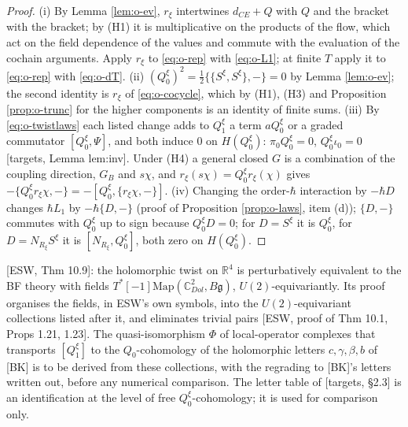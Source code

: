 \begin{proof}
(i) By Lemma \ref{lem:o-ev}, $r_\xi$ intertwines $d_{CE}+Q$ with $Q$ and the bracket with the bracket; by (H1) it is multiplicative on the products of the flow, which act on the field dependence of the values and commute with the evaluation of the cochain arguments. Apply $r_\xi$ to \eqref{eq:o-rep} with \eqref{eq:o-L1}; at finite $T$ apply it to \eqref{eq:o-rep} with \eqref{eq:o-dT}. (ii) $(Q_0^\xi)^2=\tfrac12\{\{S^\xi,S^\xi\},-\}=0$ by Lemma \ref{lem:o-ev}; the second identity is $r_\xi$ of \eqref{eq:o-cocycle}, which by (H1), (H3) and Proposition \ref{prop:o-trunc} for the higher components is an identity of finite sums. (iii) By \eqref{eq:o-twistlaws} each listed change adds to $Q_1^\xi$ a term $aQ_0^\xi$ or a graded commutator $[Q_0^\xi,\Psi]$, and both induce $0$ on $H(Q_0^\xi)$: $\pi_0Q_0^\xi=0$, $Q_0^\xi\iota_0=0$ [targets, Lemma lem:inv]. Under (H4) a general closed $G$ is a combination of the coupling direction, $G_B$ and $s\chi$, and $r_\xi(s\chi)=Q_0^\xi r_\xi(\chi)$ gives $-\{Q_0^\xi r_\xi\chi,-\}=-[Q_0^\xi,\{r_\xi\chi,-\}]$. (iv) Changing the order-$\hbar$ interaction by $-\hbar D$ changes $\hbar L_1$ by $-\hbar\{D,-\}$ (proof of Proposition \ref{prop:o-laws}, item (d)); $\{D,-\}$ commutes with $Q_0^\xi$ up to sign because $Q_0^\xi D=0$; for $D=S^\xi$ it is $Q_0^\xi$, for $D=N_{R_\xi}S^\xi$ it is $[N_{R_\xi},Q_0^\xi]$, both zero on $H(Q_0^\xi)$.
\end{proof}

\begin{remark}
\label{rem:o-transport}
[ESW, Thm 10.9]: the holomorphic twist on $\mathbb R^4$ is perturbatively equivalent to the BF theory with fields $T^*[-1]\mathrm{Map}(\mathbb C^2_{Dol},B\mathfrak g)$, $U(2)$-equivariantly. Its proof organises the fields, in ESW's own symbols, into the $U(2)$-equivariant collections listed after it, and eliminates trivial pairs [ESW, proof of Thm 10.1, Props 1.21, 1.23]. The quasi-isomorphism $\Phi$ of local-operator complexes that transports $[Q_1^\xi]$ to the $Q_0$-cohomology of the holomorphic letters $c,\gamma,\beta,b$ of [BK] is to be derived from these collections, with the regrading to [BK]'s letters written out, before any numerical comparison. The letter table of [targets, §2.3] is an identification at the level of free $Q_0^\xi$-cohomology; it is used for comparison only.
\end{remark}

